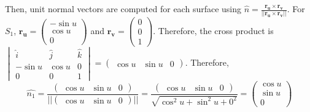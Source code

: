 \documentclass{article}
\begin{document}
Then, unit normal vectors are computed for each surface using $\hat{n} = \frac{\mathbf{r_u} \times \mathbf{r_v}}{|| \mathbf{r_u} \times \mathbf{r_v} ||}$. For $S_1$, $\mathbf{r_u} = \begin{pmatrix} -\sin u \\ \cos u \\ 0  \end{pmatrix}$ and $\mathbf{r_v} = \begin{pmatrix} 0 \\ 0 \\ 1  \end{pmatrix}$. Therefore, the cross product is $\begin{vmatrix} \hat{i} & \hat{j} & \hat{k} \\ -\sin u & \cos u & 0 \\ 0 & 0 & 1 \end{vmatrix} = \begin{pmatrix} \cos u & \sin u & 0  \end{pmatrix}$. Therefore,
\begin{equation*}
  \hat{n_1} = \frac{\begin{pmatrix} \cos u & \sin u & 0  \end{pmatrix}}{|| \begin{pmatrix} \cos u & \sin u & 0  \end{pmatrix} ||} = \frac{\begin{pmatrix} \cos u & \sin u & 0  \end{pmatrix}}{\sqrt{\cos^2 u + \sin^2 u + 0^2}} = \begin{pmatrix} \cos u \\ \sin u \\ 0  \end{pmatrix}
\end{equation*}
\end{document}
